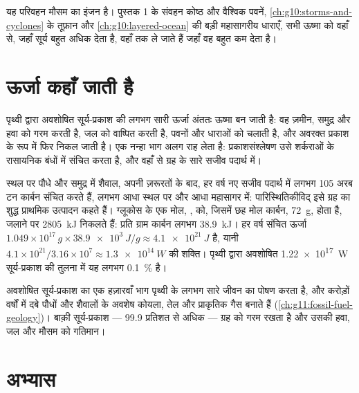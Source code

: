 यह परिवहन मौसम का इंजन है। पुस्तक 1 के संवहन कोष्ठ और वैश्विक पवनें,
\cref{ch:g10:storms-and-cyclones} के तूफ़ान और
\cref{ch:g10:layered-ocean} की बड़ी महासागरीय धाराएँ, सभी ऊष्मा को वहाँ से, जहाँ सूर्य बहुत अधिक
देता है, वहाँ तक ले जाते हैं जहाँ वह बहुत कम देता है।

\section{ऊर्जा कहाँ जाती है}

पृथ्वी द्वारा अवशोषित सूर्य-प्रकाश की लगभग सारी ऊर्जा अंततः ऊष्मा बन जाती है:
वह ज़मीन, समुद्र और हवा को गरम करती है, जल को वाष्पित करती है, पवनों और धाराओं को चलाती
है, और अवरक्त प्रकाश के रूप में फिर निकल जाती है। एक नन्हा भाग अलग राह
लेता है: प्रकाशसंश्लेषण उसे शर्कराओं के रासायनिक बंधों में संचित करता है,
और वहाँ से ग्रह के सारे सजीव पदार्थ में।

\begin{example}[प्रकाशसंश्लेषण का हिस्सा]\label{ex:g10:earth-energy-budget:photosynthesis}
स्थल पर पौधे और समुद्र में शैवाल, अपनी ज़रूरतों के बाद, हर वर्ष नए सजीव पदार्थ में लगभग
\num{105} अरब टन कार्बन संचित करते हैं, लगभग
आधा स्थल पर और आधा महासागर में: पारिस्थितिकीविद् इसे ग्रह का शुद्ध प्राथमिक
उत्पादन कहते हैं। ग्लूकोस के एक मोल,
, को, जिसमें छह मोल कार्बन, \qty{72}{g}, होता है, जलाने पर
\qty{2805}{kJ} निकलते हैं: प्रति ग्राम कार्बन लगभग \qty{38.9}{kJ}। हर वर्ष संचित ऊर्जा
$1.049\times10^{17}\,\unit{g} \times \qty{38.9e3}{J/g} \approx
\qty{4.1e21}{J}$ है, यानी $4.1\times10^{21}/3.16\times10^{7} \approx
\qty{1.3e14}{W}$ की शक्ति। पृथ्वी द्वारा अवशोषित \qty{1.22e17}{W} सूर्य-प्रकाश की तुलना में
यह लगभग \qty{0.1}{\percent} है।
\end{example}

\begin{remark}[छोटा हिस्सा, बड़ी भूमिका]\label{rem:g10:earth-energy-budget:life}
अवशोषित सूर्य-प्रकाश का एक हज़ारवाँ भाग पृथ्वी के लगभग सारे जीवन का पोषण करता है,
और करोड़ों वर्षों में दबे पौधों और शैवालों के अवशेष कोयला, तेल और प्राकृतिक
गैस बनाते हैं (\cref{ch:g11:fossil-fuel-geology})। बाक़ी
सूर्य-प्रकाश --- 99.9 प्रतिशत से अधिक --- ग्रह को गरम रखता है
और उसकी हवा, जल और मौसम को गतिमान।
\end{remark}

\section{अभ्यास}

